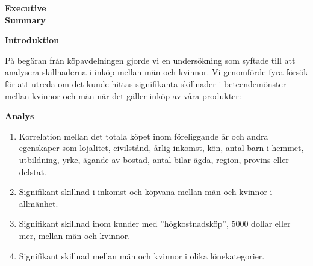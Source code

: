 \documentclass[letter,11pt]{report}
\begin{document}

\selectfont
{}


\setcounter{page}{1}
\pagestyle{empty}




\newcommand\paradist{2.25ex}









\textbf{\Huge Executive\\Summary}       \hspace{2in}{\huge Adventure Works 2022}

\vspace{1in} %
{\large \textbf{Introduktion}}
\vspace{2ex} %

På begäran från köpavdelningen gjorde vi en undersökning som syftade till att analysera skillnaderna i inköp mellan män och kvinnor. Vi genomförde fyra försök för att utreda om det kunde hittas signifikanta skillnader i beteendemönster mellan kvinnor och män när det gäller inköp av våra produkter:

\vspace{3ex} %
{\large \textbf{Analys}}

\begin{enumerate}
	\item Korrelation mellan det totala köpet inom föreliggande år och andra egenskaper som lojalitet, civilstånd, årlig inkomst, kön, antal barn i hemmet, utbildning, yrke, ägande av bostad, antal bilar ägda, region, provins eller delstat.%

	\item Signifikant skillnad i inkomst och köpvana mellan män och kvinnor i allmänhet.%

	\item Signifikant skillnad inom kunder med ''högkostnadsköp'', 5000 dollar eller mer, mellan män och kvinnor.%

	\item Signifikant skillnad mellan män och kvinnor i olika lönekategorier.%
\end{enumerate}
\end{document}
